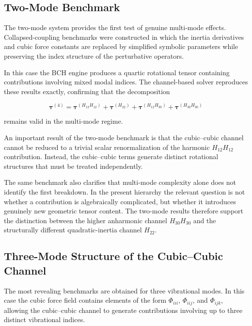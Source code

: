 \documentclass[aip,jcp,reprint]{revtex4-2}
\begin{document}
\subsection{Two-Mode Benchmark}

The two-mode system provides the first test of genuine multi-mode
effects.
Collapsed-coupling benchmarks were constructed in which the inertia
derivatives and cubic force constants are replaced by simplified
symbolic parameters while preserving the index structure of the
perturbative operators.

In this case the BCH engine produces a quartic rotational tensor
containing contributions involving mixed modal indices.
The channel-based solver reproduces these results exactly, confirming
that the decomposition

\begin{equation}
\bm{\tau}^{(4)} =
\bm{\tau}^{(H_{12}H_{12})}
+
\bm{\tau}^{(H_{22})}
+
\bm{\tau}^{(H_{12}H_{30})}
+
\bm{\tau}^{(H_{30}H_{30})}
\end{equation}

remains valid in the multi-mode regime.

An important result of the two-mode benchmark is that the cubic--cubic
channel cannot be reduced to a trivial scalar renormalization of the
harmonic $H_{12}H_{12}$ contribution.
Instead, the cubic--cubic terms generate distinct rotational structures
that must be treated independently.

The same benchmark also clarifies that multi-mode complexity alone does
not identify the first breakdown. In the present hierarchy the relevant
question is not whether a contribution is algebraically complicated, but
whether it introduces genuinely new geometric tensor content. The
two-mode results therefore support the distinction between the higher
anharmonic channel $H_{30}H_{30}$ and the structurally different
quadratic-inertia channel $H_{22}$.

\subsection{Three-Mode Structure of the Cubic--Cubic Channel}

The most revealing benchmarks are obtained for three vibrational modes.
In this case the cubic force field contains elements of the form
$\Phi_{iii}$, $\Phi_{iij}$, and $\Phi_{ijk}$, allowing the cubic--cubic
channel to generate contributions involving up to three distinct
vibrational indices.
\end{document}
